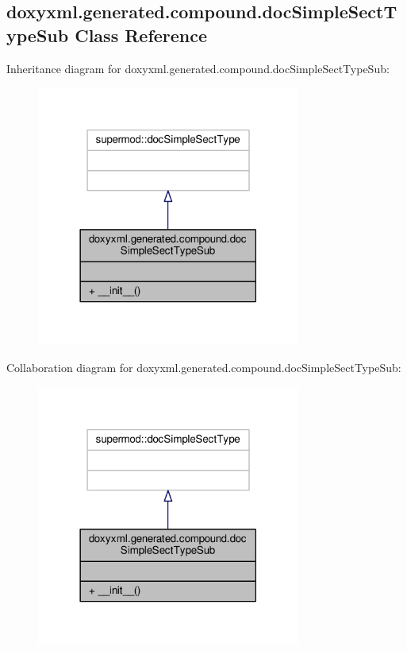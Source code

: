 \subsection{doxyxml.\+generated.\+compound.\+doc\+Simple\+Sect\+Type\+Sub Class Reference}
\label{classdoxyxml_1_1generated_1_1compound_1_1docSimpleSectTypeSub}


Inheritance diagram for doxyxml.\+generated.\+compound.\+doc\+Simple\+Sect\+Type\+Sub\+:
\nopagebreak
\begin{figure}[H]
\begin{center}
\leavevmode
\includegraphics[width=246pt]{de/d9b/classdoxyxml_1_1generated_1_1compound_1_1docSimpleSectTypeSub__inherit__graph}
\end{center}
\end{figure}


Collaboration diagram for doxyxml.\+generated.\+compound.\+doc\+Simple\+Sect\+Type\+Sub\+:
\nopagebreak
\begin{figure}[H]
\begin{center}
\leavevmode
\includegraphics[width=246pt]{dd/d33/classdoxyxml_1_1generated_1_1compound_1_1docSimpleSectTypeSub__coll__graph}
\end{center}
\end{figure}
